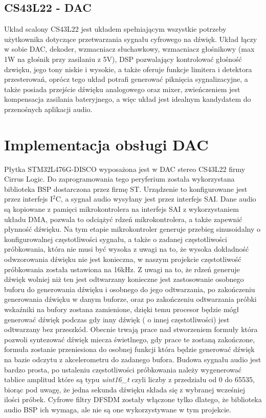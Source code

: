 \documentclass[10pt, a4paper]{article}
\begin{document}
\subsection{CS43L22 - DAC}
Układ scalony CS43L22 jest układem spełniającym wszystkie potrzeby użytkownika dotyczące przetwarzania sygnału cyfrowego na dźwięk. Układ łączy w sobie DAC, dekoder, wzmacniacz słuchawkowy, wzmacniacz głośnikowy (max 1W na głośnik przy zasilaniu z 5V), DSP pozwalający kontrolować głośność dzwięku, jego tony niskie i wysokie, a także oferuje funkcje limitera i detektora przesterowań, oprócz tego układ potrafi generować piknięcia sygnalizacyjne, a także posiada przejście dźwięku analogowego oraz mixer, zwieńczeniem jest kompensacja zasilania bateryjnego, a więc układ jest idealnym kandydatem do przenośnych aplikacji audio. 

	
	\section{Implementacja obsługi DAC}
Płytka STM32L476G-DISCO wyposażona jest w DAC stereo CS43L22 firmy Cirrus Logic. Do zaprogramowania tego peryferium została wykorzystana biblioteka BSP dostarczona przez firmę ST. Urządzenie to konfigurowane jest przez interfejs I$^2$C, a sygnał audio wysyłany jest przez interfejs SAI. Dane audio są kopiowane z pamięci mikrokontrolera na interfejs SAI z wykorzystaniem układu DMA, pozwala to odciążyć rdzeń mikrokontrolera, a także zapewnić płynność dźwięku. Na tym etapie mikrokontroler generuje przebieg sinusoidalny o konfigurowalnej częstotliwości sygnału, a także o zadanej częstotliwości próbkowania, która nie musi być wysoka z uwagi na to, że wysoka dokładność odwzorowania dźwięku nie jest konieczna, w naszym projekcie częstotliwość próbkowania została ustawiona na 16kHz. Z uwagi na to, że rdzeń generuje dźwięk wolniej niż ten jest odtwarzany konieczne jest zastosowanie osobnego buforu do generowania dźwięku i osobnego do jego odtwarzania, po zakończeniu generowania dźwięku w danym buforze, oraz po zakończeniu odtwarzania próbki wskaźniki na bufory zostana zamienione, dzięki temu procesor będzie mógł generować dźwięk podczas gdy inny dźwięk ( o innej częstotliwości) jest odtwarzany bez przeszkód. Obecnie trwają prace nad stworzeniem formuły która pozwoli syntezować dźwięk miecza świetlnego, gdy prace te zostaną zakończone, formuła zostanie przeniesiona do osobnej funkcji która będzie generować dźwięk na bazie odczytu z akcelerometru do zadanego bufora. Budowa sygnału audio jest bardzo prosta, po ustaleniu częstotliwości próbkowania należy wygenerować tablice amplitud które są typu \textit{uint16\_t} czyli liczby z przedziału od 0 do 65535, biorąc pod uwagę, że jedna sekunda dźwięku składa się z wybranej wcześniej ilości próbek. Cyfrowe filtry DFSDM zostały włączone tylko dlatego, że biblioteka audio BSP ich wymaga, ale nie są one wykorzystywane w tym projekcie.
\end{document}

